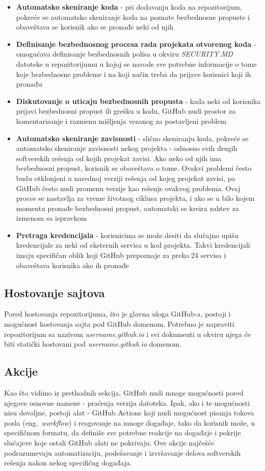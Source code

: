 \documentclass[12pt]{report}
\begin{document}
\begin{itemize}
    \item \textbf{Automatsko skeniranje koda} - pri dodavanju koda na repozitorijum, pokreće se automatsko skeniranje koda na poznate bezbednosne propuste i obaveštava se korisnik ako se pronađe neki od njih
    \item \textbf{Definisanje bezbednosnog procesa rada projekata otvorenog koda} - omogućava definisanje bezbednosnih polisa u okviru \textit{SECURITY.MD} datoteke u repozitorijumu u kojoj se navode sve potrebne informacije o tome koje bezbednosne probleme i na koji način treba da prijave korisnici koji ih pronađu
    \item \textbf{Diskutovanje o uticaju bezbednosnih propusta} - kada neki od korisnika prijavi bezbednosni propust ili grešku u kodu, GitHub nudi prostor za komentarisanje i razmenu mišljenja vezanog za postavljeni problem
    \item \textbf{Automatsko skeniranje zavisnosti} - slično skeniranju koda, pokreće se automatsko skeniranje zavisnosti nekog projekta - odnosno svih drugih softverskih rešenja od kojih projekat zavisi. Ako neko od njih ima bezbednosni propust, korisnik se obaveštava o tome. Ovakvi problemi često budu otklonjeni u narednoj verziji rešenja od kojeg projekat zavisi, pa GitHub često nudi promenu verzije kao rešenje ovakvog problema. Ovaj proces se nastavlja za vreme životnog ciklusa projekta, i ako se u bilo kojem momentu pronađe bezbednosni propust, automatski se kreira zahtev za izmenom sa ispravkom
    \item \textbf{Pretraga kredencijala} - korisnicima se može desiti da slučajno upišu kredencijale za neki od eksternih servisa u kod projekta. Takvi kredencijali imaju specifičan oblik koji GitHub prepoznaje za preko 24 servisa i obaveštava korisnika ako ih pronađe
\end{itemize}

\subsection{Hostovanje sajtova}
Pored hostovanja repozitorijuma, što je glavna uloga GitHub-a, postoji i mogućnost hostovanja sajta pod GitHub domenom. Potrebno je napraviti repozitorijum sa nazivom \textit{username.github.io} i svi dokumenti u okviru njega će biti statički hostovani pod \textit{username.github.io} domenom.

\subsection{Akcije}
Kao što vidimo iz prethodnih sekcija, GitHub nudi mnoge mogućnosti pored njegove osnovne namene - praćenja verzija datoteka. Ipak, ako i te mogućnosti nisu dovoljne, postoji alat - GitHub Actions koji nudi mogućnost pisanja tokova posla (eng.\ \textit{workflow}) i reagovanje na mnoge događaje, tako da korisnik može, u specifičnom formatu, da definiše sve potrebne reakcije na događaje i pokrije slučajeve koje ostali GitHub alati ne pokrivaju. Ove akcije najčešće podrazumevaju automatizaciju, podešavanje i izvršavanje delova softverskih rešenja nakon nekog specifičng događaja.
\end{document}
